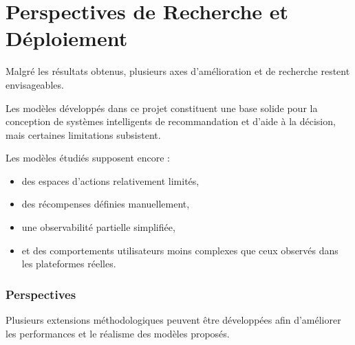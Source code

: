 \documentclass[11pt,a4paper]{article}
\begin{document}
\section{Perspectives de Recherche et Déploiement}

Malgré les résultats obtenus,
plusieurs axes d’amélioration
et de recherche restent envisageables.

Les modèles développés dans ce projet
constituent une base solide
pour la conception de systèmes intelligents
de recommandation et d’aide à la décision,
mais certaines limitations subsistent.

\vspace{0.3cm}

Les modèles étudiés supposent encore :
\begin{itemize}
    \item des espaces d’actions relativement limités,
    \item des récompenses définies manuellement,
    \item une observabilité partielle simplifiée,
    \item et des comportements utilisateurs
    moins complexes que ceux observés
    dans les plateformes réelles.
\end{itemize}

\vspace{0.4cm}

\subsubsection*{Perspectives }

Plusieurs extensions méthodologiques
peuvent être développées
afin d’améliorer les performances
et le réalisme des modèles proposés.
\end{document}
